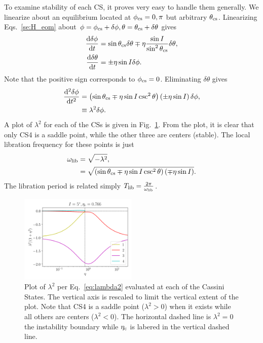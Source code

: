 \documentclass[
        fleqn,
        usenatbib,
    ]{mnras}
\newcommand*{\rd}[2]{\frac{\mathrm{d}#1}{\mathrm{d}#2}}
\newcommand*{\rtd}[2]{\frac{\mathrm{d}^2#1}{\mathrm{d}#2^2}}
\newcommand*{\p}[1]{\left(#1\right)}
\begin{document}
To examine stability of each CS, it proves very easy to handle them generally.
We linearize about an equilibrium located at $\phi_{\rm cs} = 0, \pi$ but
arbitrary $\theta_{\rm cs}$. Linearizing Eqs.~\eqref{se:H_eom} about $\phi =
\phi_{\rm cs} + \delta \phi, \theta = \theta_{\rm cs} + \delta \theta$ gives
\begin{subequations}\label{se:H_eom_lin}
    \begin{align}
        \rd{\delta \phi}{t} &= \sin \theta_{\rm cs} \delta \theta
            \mp \eta \frac{\sin I}{\sin^2\theta_{\rm cs}} \delta \theta,\\
        \rd{\delta \theta}{t} &= \pm \eta \sin I \delta \phi.
    \end{align}
\end{subequations}
Note that the positive sign corresponds to $\phi_{\rm cs} = 0$. Eliminating
$\delta \theta$ gives
\begin{align}
    \rtd{\delta \phi}{t} &= \p{\sin \theta_{\rm cs}
        \mp \eta \sin I\csc^2\theta}\p{\pm \eta \sin I} \delta
            \phi,\\
        &\equiv \lambda^2\delta \phi.\label{eq:lambda2}
\end{align}
A plot of $\lambda^2$ for each of the CSs is given in Fig.~\ref{fig:lambda2}.
From the plot, it is clear that only CS4 is a saddle point, while the other
three are centers (stable). The local libration frequency for these points is
just
\begin{align}
    \omega_{\rm lib} &= \sqrt{-\lambda^2},\\
        &= \sqrt{\p{\sin \theta_{\rm cs}
            \mp \eta \sin I \csc^2\theta}\p{\mp \eta \sin I}}.
\end{align}
The libration period is related simply $T_{\rm lib} = \frac{2\pi}{\omega_{\rm
lib}}$.
\begin{figure}[t]
    \centering
    \includegraphics[width=0.5\textwidth]{plots_diskdisp/2_lambdas.png}
    \caption{Plot of $\lambda^2$ per Eq.~\eqref{eq:lambda2} evaluated at each
    of the Cassini States. The vertical axis is rescaled to limit the vertical
    extent of the plot. Note that CS4 is a saddle point ($\lambda^2 > 0$) when
    it exists while all others are centers ($\lambda^2 < 0$). The horizontal
    dashed line is $\lambda^2 = 0$ the instability boundary while $\eta_{\rm c}$ is
    labered in the vertical dashed line.}\label{fig:lambda2}
\end{figure}
\end{document}
